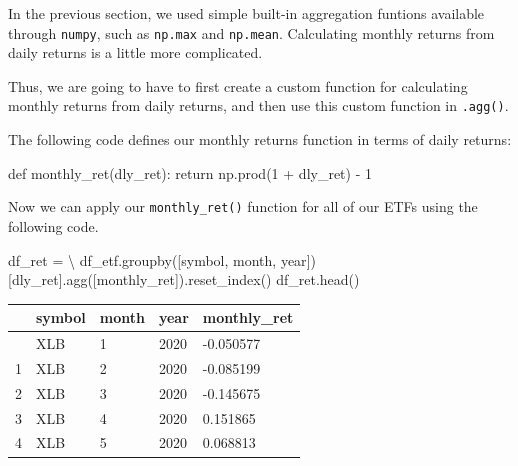 \documentclass[
  letterpaper,
  DIV=11,
  numbers=noendperiod]{scrreprt}
\newenvironment{Shaded}{\begin{snugshade}}{\end{snugshade}}
\newcommand{\ControlFlowTok}[1]{\textcolor[rgb]{0.00,0.23,0.31}{#1}}
\newcommand{\DecValTok}[1]{\textcolor[rgb]{0.68,0.00,0.00}{#1}}
\newcommand{\KeywordTok}[1]{\textcolor[rgb]{0.00,0.23,0.31}{#1}}
\newcommand{\NormalTok}[1]{\textcolor[rgb]{0.00,0.23,0.31}{#1}}
\newcommand{\OperatorTok}[1]{\textcolor[rgb]{0.37,0.37,0.37}{#1}}
\newcommand{\StringTok}[1]{\textcolor[rgb]{0.13,0.47,0.30}{#1}}
\begin{document}
In the previous section, we used simple built-in aggregation funtions
available through \texttt{numpy}, such as \texttt{np.max} and
\texttt{np.mean}. Calculating monthly returns from daily returns is a
little more complicated.

Thus, we are going to have to first create a custom function for
calculating monthly returns from daily returns, and then use this custom
function in \texttt{.agg()}.

The following code defines our monthly returns function in terms of
daily returns:

\begin{Shaded}
\begin{Highlighting}[]
\KeywordTok{def}\NormalTok{ monthly\_ret(dly\_ret):}
    \ControlFlowTok{return}\NormalTok{ np.prod(}\DecValTok{1} \OperatorTok{+}\NormalTok{ dly\_ret) }\OperatorTok{{-}} \DecValTok{1}
\end{Highlighting}
\end{Shaded}

Now we can apply our \texttt{monthly\_ret()} function for all of our
ETFs using the following code.

\begin{Shaded}
\begin{Highlighting}[]
\NormalTok{df\_ret }\OperatorTok{=} \OperatorTok{\textbackslash{}}
\NormalTok{    df\_etf.groupby([}\StringTok{\textquotesingle{}symbol\textquotesingle{}}\NormalTok{, }\StringTok{\textquotesingle{}month\textquotesingle{}}\NormalTok{, }\StringTok{\textquotesingle{}year\textquotesingle{}}\NormalTok{])[}\StringTok{\textquotesingle{}dly\_ret\textquotesingle{}}\NormalTok{].agg([monthly\_ret]).reset\_index()}
\NormalTok{df\_ret.head()}
\end{Highlighting}
\end{Shaded}

\begin{longtable}[]{@{}lllll@{}}
\toprule\noalign{}
& symbol & month & year & monthly\_ret \\
\midrule\noalign{}
\endhead
\bottomrule\noalign{}
\endlastfoot
0 & XLB & 1 & 2020 & -0.050577 \\
1 & XLB & 2 & 2020 & -0.085199 \\
2 & XLB & 3 & 2020 & -0.145675 \\
3 & XLB & 4 & 2020 & 0.151865 \\
4 & XLB & 5 & 2020 & 0.068813 \\
\end{longtable}
\end{document}
